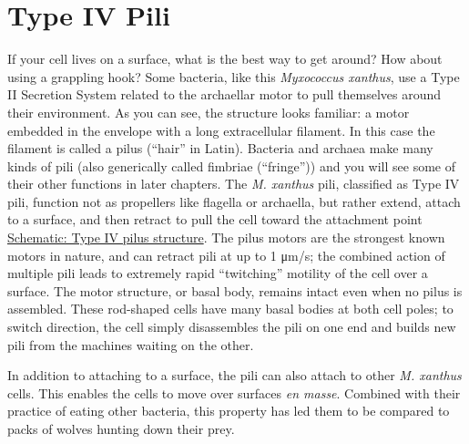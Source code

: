 \documentclass[]{tufte-book}
\begin{document}
\section{Type IV Pili}\label{type-iv-pili}

If your cell lives on a surface, what is the best way to get around? How
about using a grappling hook? Some bacteria, like this \emph{Myxococcus
xanthus}, use a Type II Secretion System related to the archaellar motor
to pull themselves around their environment. As you can see, the
structure looks familiar: a motor embedded in the envelope with a long
extracellular filament. In this case the filament is called a pilus
(``hair'' in Latin). Bacteria and archaea make many kinds of pili (also
generically called fimbriae (``fringe'')) and you will see some of their
other functions in later chapters. The \emph{M. xanthus} pili,
classified as Type IV pili, function not as propellers like flagella or
archaella, but rather extend, attach to a surface, and then retract to
pull the cell toward the attachment point
\protect\hyperlink{Type_IV_pilus_structure}{Schematic: Type IV pilus
structure}. The pilus motors are the strongest known motors in nature,
and can retract pili at up to 1 μm/s; the combined action of multiple
pili leads to extremely rapid ``twitching'' motility of the cell over a
surface. The motor structure, or basal body, remains intact even when no
pilus is assembled. These rod-shaped cells have many basal bodies at
both cell poles; to switch direction, the cell simply disassembles the
pili on one end and builds new pili from the machines waiting on the
other.

In addition to attaching to a surface, the pili can also attach to other
\emph{M. xanthus} cells. This enables the cells to move over surfaces
\emph{en masse}. Combined with their practice of eating other bacteria,
this property has led them to be compared to packs of wolves hunting
down their prey.
\end{document}
